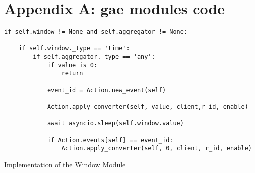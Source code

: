 \chapter{Appendix A: \acf{gae} modules code}
\label{chapter:appendix-a}

\begin{listing}[H]
	\begin{verbatim}
if self.window != None and self.aggregator != None:

    if self.window._type == 'time':
        if self.aggregator._type == 'any':
            if value is 0:
                return

            event_id = Action.new_event(self)

            Action.apply_converter(self, value, client,r_id, enable)

            await asyncio.sleep(self.window.value)

            if Action.events[self] == event_id:
                Action.apply_converter(self, 0, client, r_id, enable)
	\end{verbatim}
	\caption{Implementation of the Window Module}
	\label{snippet:rule}
\end{listing}

